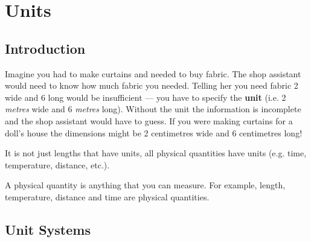          \chapter{Units}
    \setcounter{figure}{1}\setcounter{subfigure}{1}\label{m30853}
    \section{Introduction}
            \nopagebreak
      \label{m30853*id62184}Imagine you had to make curtains and needed to buy fabric. The
shop assistant would need to know how much fabric you needed.
Telling her you need fabric 2 wide and 6 long would be
insufficient --- you have to specify the \textbf{unit} (i.e. 2 \textsl{metres} wide and 6 \textsl{metres} long). Without the unit the
information is incomplete and the shop assistant would have to
guess. If you were making curtains for a doll's house the
dimensions might be 2 centimetres wide and 6 centimetres long!\par 
      \label{m30853*id62547}It is not just lengths that have units, all physical quantities
have units (e.g. time, temperature, distance, etc.).\par 
{} { A physical quantity is anything
that you can measure. For example, length, temperature, distance
and time are physical quantities.} 
    \section{Unit Systems}
            \nopagebreak
      \label{m30853*uid1}
